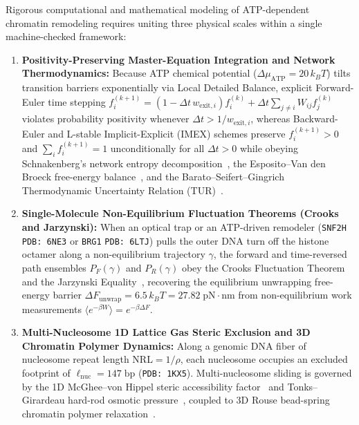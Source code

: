 \documentclass[11pt,a4paper]{article}
\theoremstyle{definition}
\begin{document}
Rigorous computational and mathematical modeling of ATP-dependent chromatin remodeling requires uniting three physical scales within a single machine-checked framework:
\begin{enumerate}
  \item \textbf{Positivity-Preserving Master-Equation Integration and Network Thermodynamics:} Because ATP chemical potential ($\Delta\mu_{\mathrm{ATP}} = 20\,k_B T$) tilts transition barriers exponentially via Local Detailed Balance, explicit Forward-Euler time stepping $f_i^{(k+1)} = (1 - \Delta t\,w_{\mathrm{exit},i})f_i^{(k)} + \Delta t\sum_{j \ne i} W_{ij}f_j^{(k)}$ violates probability positivity whenever $\Delta t > 1/w_{\mathrm{exit},i}$, whereas Backward-Euler and L-stable Implicit-Explicit (IMEX) schemes preserve $f_i^{(k+1)} > 0$ and $\sum_i f_i^{(k+1)} = 1$ unconditionally for all $\Delta t > 0$ while obeying Schnakenberg's network entropy decomposition~\cite{Schnakenberg1976}, the Esposito--Van den Broeck free-energy balance~\cite{EspositoVanDenBroeck2010}, and the Barato--Seifert--Gingrich Thermodynamic Uncertainty Relation (TUR)~\cite{BaratoSeifert2015,Gingrich2016}.
  \item \textbf{Single-Molecule Non-Equilibrium Fluctuation Theorems (Crooks and Jarzynski):} When an optical trap or an ATP-driven remodeler (\texttt{SNF2H} \texttt{PDB: 6NE3} or \texttt{BRG1} \texttt{PDB: 6LTJ}) pulls the outer DNA turn off the histone octamer along a non-equilibrium trajectory $\gamma$, the forward and time-reversed path ensembles $P_F(\gamma)$ and $P_R(\gamma)$ obey the Crooks Fluctuation Theorem~\cite{Crooks1999} and the Jarzynski Equality~\cite{Jarzynski1997}, recovering the equilibrium unwrapping free-energy barrier $\Delta F_{\mathrm{unwrap}} = 6.5\,k_B T = 27.82\;\mathrm{pN\cdot nm}$ from non-equilibrium work measurements $\langle e^{-\beta W}\rangle = e^{-\beta\Delta F}$.
  \item \textbf{Multi-Nucleosome 1D Lattice Gas Steric Exclusion and 3D Chromatin Polymer Dynamics:} Along a genomic DNA fiber of nucleosome repeat length $\mathrm{NRL} = 1/\rho$, each nucleosome occupies an excluded footprint of $\ell_{\mathrm{nuc}} = 147\;\mathrm{bp}$ (\texttt{PDB: 1KX5}). Multi-nucleosome sliding is governed by the 1D McGhee--von Hippel steric accessibility factor~\cite{McGheeVonHippel1974} and Tonks--Girardeau hard-rod osmotic pressure~\cite{Tonks1936,Kornberg1974}, coupled to 3D Rouse bead-spring chromatin polymer relaxation~\cite{DoiEdwards1986}.
\end{enumerate}
\end{document}
